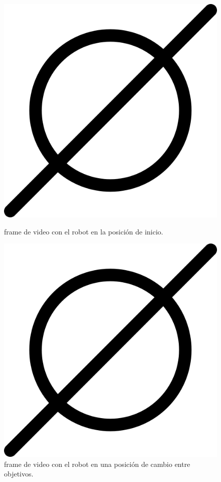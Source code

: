 \begin{figure}[htbp]
  \centering
  \begin{minipage}[b]{0.45\textwidth}
    \centering
    \includegraphics[width=\textwidth]{images/poner_foto.png}
    \caption{frame de video con el robot en la posición de inicio.}
    \label{fig:frame1_nav_compleja}
  \end{minipage}
  \hfill
  \begin{minipage}[b]{0.45\textwidth}
    \centering
    \includegraphics[width=\textwidth]{images/poner_foto.png}
    \caption{frame de video con el robot en una posición de cambio entre objetivos.}
    \label{fig:frame2_nav_compleja}
  \end{minipage}
\end{figure}
